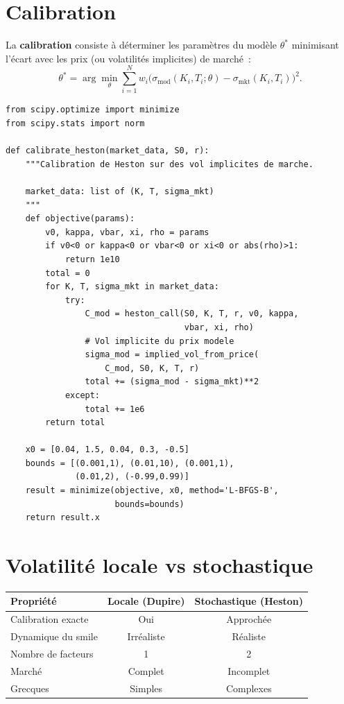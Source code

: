 \section{Calibration}

\begin{definition}
La \textbf{calibration} consiste \`a d\'eterminer les param\`etres du
mod\`ele $\theta^*$ minimisant l'\'ecart avec les prix (ou volatilit\'es
implicites) de march\'e~:
\[
    \theta^* = \arg\min_\theta \sum_{i=1}^{N}
    w_i \bigl(\sigma_{\text{mod}}(K_i, T_i; \theta)
    - \sigma_{\text{mkt}}(K_i, T_i)\bigr)^2.
\]
\end{definition}

\begin{codeblock}[title=\textbf{Calibration du mod\`ele de Heston}]
\begin{verbatim}
from scipy.optimize import minimize
from scipy.stats import norm

def calibrate_heston(market_data, S0, r):
    """Calibration de Heston sur des vol implicites de marche.

    market_data: list of (K, T, sigma_mkt)
    """
    def objective(params):
        v0, kappa, vbar, xi, rho = params
        if v0<0 or kappa<0 or vbar<0 or xi<0 or abs(rho)>1:
            return 1e10
        total = 0
        for K, T, sigma_mkt in market_data:
            try:
                C_mod = heston_call(S0, K, T, r, v0, kappa,
                                    vbar, xi, rho)
                # Vol implicite du prix modele
                sigma_mod = implied_vol_from_price(
                    C_mod, S0, K, T, r)
                total += (sigma_mod - sigma_mkt)**2
            except:
                total += 1e6
        return total

    x0 = [0.04, 1.5, 0.04, 0.3, -0.5]
    bounds = [(0.001,1), (0.01,10), (0.001,1),
              (0.01,2), (-0.99,0.99)]
    result = minimize(objective, x0, method='L-BFGS-B',
                      bounds=bounds)
    return result.x
\end{verbatim}
\end{codeblock}

\section{Volatilit\'e locale vs stochastique}

\begin{center}
\begin{tabular}{lcc}
    \toprule
    \textbf{Propri\'et\'e} & \textbf{Locale (Dupire)}
    & \textbf{Stochastique (Heston)} \\
    \midrule
    Calibration exacte & Oui & Approch\'ee \\
    Dynamique du smile & Irr\'ealiste & R\'ealiste \\
    Nombre de facteurs & 1 & 2 \\
    March\'e & Complet & Incomplet \\
    Grecques & Simples & Complexes \\
    \bottomrule
\end{tabular}
\end{center}

